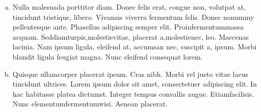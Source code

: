 \documentclass{article}
\begin{document}
\begin{homeworkProblem}
\begin{enumerate}[(a)]
	\item
	Nulla malesuada porttitor diam. Donec felis erat, congue non, volutpat at, tincidunt tristique, libero. Vivamus viverra fermentum felis. Donec nonummy pellentesque ante. Phasellus adipiscing semper elit. Proinfermentummassa acquam. Seddiamturpis,molestievitae, placerat a,molestienec, leo. Maecenas lacinia. Nam ipsum ligula, eleifend at, accumsan nec, suscipit a, ipsum. Morbi blandit ligula feugiat magna. Nunc eleifend consequat lorem. 
		
	\item
	Quisque ullamcorper placerat ipsum. Cras nibh. Morbi vel justo vitae lacus tincidunt ultrices. Lorem ipsum dolor sit amet, consectetuer adipiscing elit. In hac habitasse platea dictumst. Integer tempus convallis augue. Etiamfacilisis. Nunc elementumfermentumwisi. Aenean placerat.
\end{enumerate}

\end{homeworkProblem}
\end{document}
